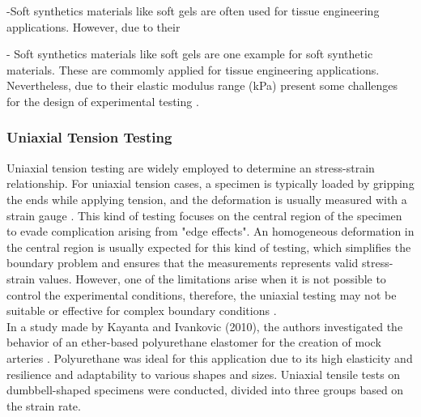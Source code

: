 -Soft synthetics materials like soft gels are often used for tissue engineering applications.
However, due to their 

- Soft synthetics materials like soft gels are one example for soft synthetic materials. These
are commomly applied for tissue engineering applications. Nevertheless, due to their elastic 
modulus range (kPa) present some challenges for the design of experimental testing \cite{Liu2009}.

\subsubsection*{Uniaxial Tension Testing}

Uniaxial tension testing are widely employed to determine an stress-strain relationship.
For uniaxial tension cases, a specimen is typically loaded by gripping the ends while applying 
tension, and the deformation is usually measured with a strain gauge \cite{Bergström2015}.
This kind of testing focuses on the central region of the specimen to evade complication arising from 
"edge effects". An homogeneous deformation in the central region is usually expected for this kind of testing, 
which simplifies the boundary problem and ensures that the measurements represents valid stress-strain values.
However, one of the limitations arise when it is not possible to control the experimental conditions, therefore, 
the uniaxial testing may not be suitable or effective for complex boundary conditions \cite{Seshaiyer2003}.\\

In a study made by Kayanta and Ivankovic (2010), the authors investigated the behavior of an ether-based polyurethane 
elastomer for the creation of mock arteries \cite{Kanyanta2010}. Polyurethane was ideal for this application due to 
its high elasticity and resilience and adaptability to various shapes and sizes. Uniaxial tensile tests on 
dumbbell-shaped specimens were conducted, divided into three groups based on the strain rate.

